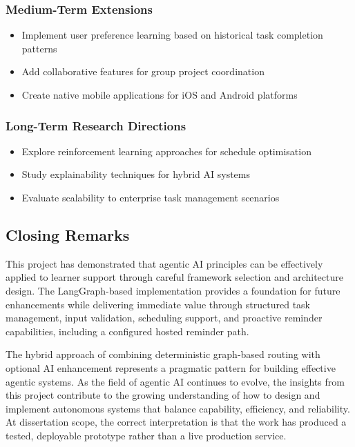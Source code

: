 \documentclass[12pt]{article}
\begin{document}
\subsubsection{Medium-Term Extensions}
\begin{itemize}
    \item Implement user preference learning based on historical task completion patterns
    \item Add collaborative features for group project coordination
    \item Create native mobile applications for iOS and Android platforms
\end{itemize}

\subsubsection{Long-Term Research Directions}
\begin{itemize}
    \item Explore reinforcement learning approaches for schedule optimisation
    \item Study explainability techniques for hybrid AI systems
    \item Evaluate scalability to enterprise task management scenarios
\end{itemize}

\subsection{Closing Remarks}

This project has demonstrated that agentic AI principles can be effectively applied to learner support through careful framework selection and architecture design. The LangGraph-based implementation provides a foundation for future enhancements while delivering immediate value through structured task management, input validation, scheduling support, and proactive reminder capabilities, including a configured hosted reminder path.

The hybrid approach of combining deterministic graph-based routing with optional AI enhancement represents a pragmatic pattern for building effective agentic systems. As the field of agentic AI continues to evolve, the insights from this project contribute to the growing understanding of how to design and implement autonomous systems that balance capability, efficiency, and reliability. At dissertation scope, the correct interpretation is that the work has produced a tested, deployable prototype rather than a live production service.
\end{document}
